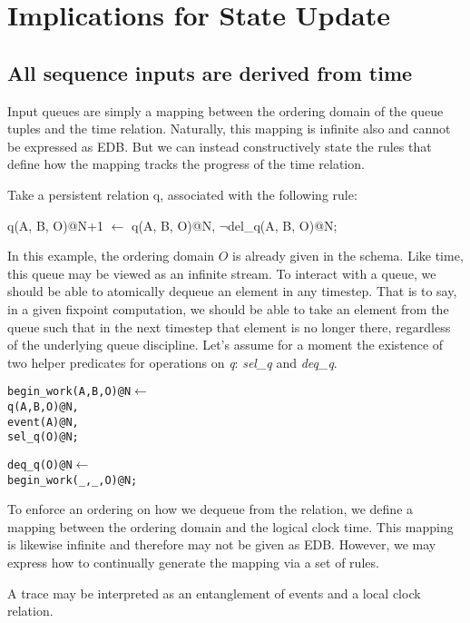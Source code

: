 \section{Implications for State Update}

\subsection{All sequence inputs are derived from time}

Input queues are simply a mapping between the ordering domain of the queue tuples and the time relation.  Naturally, this mapping
is infinite also and cannot be expressed as EDB.  But we can instead constructively state the rules that define how the mapping 
tracks the progress of the time relation.

Take a persistent relation q, associated with the following rule:

\begin{Dedalus}
q(A, B, O)@N+1 \(\leftarrow\)
  q(A, B, O)@N, 
  \(\lnot\)del\_q(A, B, O)@N;
\end{Dedalus}

In this example, the ordering domain $O$ is already given in the schema.  Like time, this queue may be viewed as an infinite stream.
To interact with a queue, we should be able to atomically dequeue an element in any timestep.  That is to say, in a given fixpoint computation,
we should be able to take an element from the queue such that in the next timestep that element is no longer there, regardless of the
underlying queue discipline.  Let's assume for a moment the existence of two helper predicates for operations on \emph{q}: \emph{sel\_q} and
\emph{deq\_q}.  


\begin{alltt}
begin_work(A, B, O)@N \(\leftarrow\)
  q(A, B, O)@N,
  event(A)@N, 
  sel_q(O)@N;
  
  
deq_q(O)@N \(\leftarrow\) 
  begin_work(_, _, O)@N;
\end{alltt}


To enforce an ordering on how we dequeue from the relation, we define a mapping between the ordering domain and the logical clock
time.  This mapping is likewise infinite and therefore may not be given as EDB.  However, we may express how to continually generate 
the mapping via a set of rules.

A trace may be interpreted as an entanglement of events and a local clock relation.

